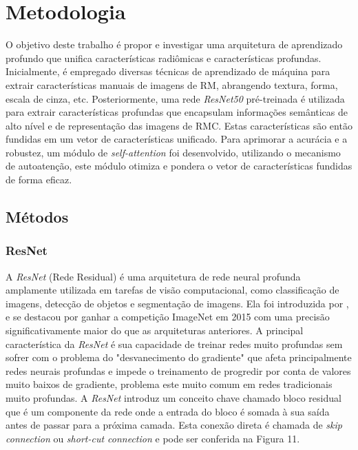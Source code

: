 \chapter{Metodologia} 
\label{chap:metodologia}

O objetivo deste trabalho é propor e investigar uma arquitetura de aprendizado profundo que unifica características radiômicas e características profundas. Inicialmente, é empregado diversas técnicas de aprendizado de máquina para extrair características manuais de imagens de RM, abrangendo textura, forma, escala de cinza, etc. Posteriormente, uma rede \textit{ResNet50} pré-treinada é utilizada para extrair características profundas que encapsulam informações semânticas de alto nível e de representação das imagens de \gls{RMC}. Estas características são então fundidas em um vetor de características unificado. Para aprimorar a acurácia e a robustez, um módulo de \textit{self-attention} foi desenvolvido, utilizando o mecanismo de autoatenção, este módulo otimiza e pondera o vetor de características fundidas de forma eficaz.

\section{Métodos}
\label{sec:cap4_metodos}


\subsection{ResNet}
\label{subsec:cap4_resnet}

A \textit{ResNet} (Rede Residual) é uma arquitetura de rede neural profunda amplamente utilizada em tarefas de visão computacional, como classificação de imagens, detecção de objetos e segmentação de imagens. Ela foi introduzida por  \cite{heDeepResidualLearning2015}, e se destacou por ganhar a competição ImageNet em 2015 com uma precisão significativamente maior do que as arquiteturas anteriores. A principal característica da \textit{ResNet} é sua capacidade de treinar redes muito profundas sem sofrer com o problema do "desvanecimento do gradiente" que afeta principalmente redes neurais profundas e impede o treinamento de progredir por conta de valores muito baixos de gradiente, problema este muito comum em redes tradicionais muito profundas. A \textit{ResNet} introduz um conceito chave chamado bloco residual que é um componente da rede onde a entrada do bloco é somada à sua saída antes de passar para a próxima camada. Esta conexão direta é chamada de \textit{skip connection} ou \textit{short-cut connection} e pode ser conferida na Figura 11.

